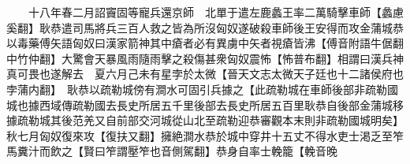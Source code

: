 　　十八年春二月詔竇固等寵兵還京師　北單于遣左鹿蠡王率二萬騎擊車師【蠡慮奚翻】耿恭遣司馬將兵三百人救之皆為所沒匈奴遂破殺車師後王安得而攻金蒲城恭以毒藥傅矢語匈奴曰漢家箭神其中瘡者必有異虜中矢者視瘡皆沸【傅音附語牛倨翻中竹仲翻】大驚會天暴風雨隨雨擊之殺傷甚衆匈奴震怖【怖普布翻】相謂曰漢兵神真可畏也遂解去　夏六月己未有星孛於太微【晉天文志太微天子廷也十二諸侯府也孛蒲内翻】　耿恭以疏勒城傍有澗水可固引兵據之【此疏勒城在車師後部非疏勒國城也據西域傳疏勒國去長史所居五千里後部去長史所居五百里耿恭自後部金蒲城移據疏勒城其後范羌又自前部交河城從山北至疏勒迎恭審觀本末則非疏勒國城明矣】秋七月匈奴復來攻【復扶又翻】擁絶澗水恭於城中穿井十五丈不得水吏士渇乏至笮馬糞汁而飲之【賢曰笮謂壓笮也音側駕翻】恭身自率士輓籠【輓音晚